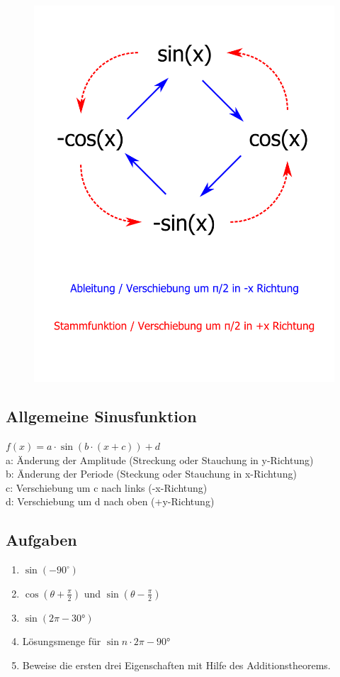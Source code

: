 \documentclass{article}
\begin{document}
\begin{figure}[H]
    \centering
    \includegraphics[width=0.45\linewidth]{Ableitungskreis.png}
    \captionsetup{labelformat=empty}
\end{figure}

\subsection*{Allgemeine Sinusfunktion}

$f\left(x\right)=a\cdot\sin\left(b\cdot\left(x+c\right)\right)+d$ \\

\noindent a: Änderung der Amplitude (Streckung oder Stauchung in y-Richtung) \\
b: Änderung der Periode (Steckung oder Stauchung in x-Richtung) \\
c: Verschiebung um c nach links (-x-Richtung) \\
d: Verschiebung um d nach oben (+y-Richtung)

\subsection*{Aufgaben}

\begin{enumerate}[label=$\alph*)$]
    \item $ \sin{(-90^\circ)} $
    \item $ \cos{(\theta + \frac{\pi}{2})} $ und $ \sin{(\theta - \frac{\pi}{2})} $
    \item $ \sin{(2\pi - 30°)} $
    \item Lösungsmenge für $ \sin{n \cdot 2\pi - 90°} $
    \item Beweise die ersten drei Eigenschaften mit Hilfe des Additionstheorems.
\end{enumerate}
\end{document}
